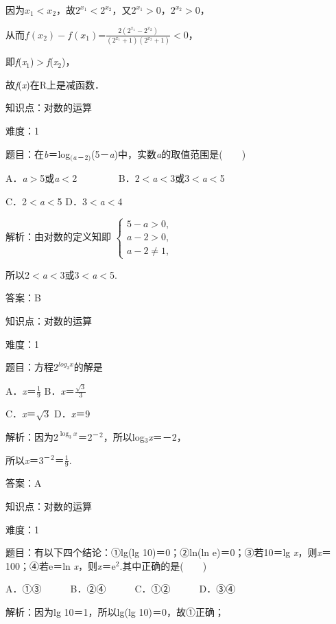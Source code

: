 \documentclass{article} %
\begin{document}
因为$x_{1}<x_{2}$，故$2^{x_{1}}<2^{x_{2}}$，又$2^{x_{1}}>0$，$2^{x_{2}}>0$，

从而$f(x_{2})-f(x_{1})$=$\frac{2(2^{x_{1}}-2^{x_{2}})}{(2^{x_{1}}+1)(2^{x_{2}}+1)}<0$，

即\textit{f}(\textit{x}${}_{1}$)$\mathrm{>}$\textit{f}(\textit{x}${}_{2}$)，

故\textit{f}(\textit{x})在R上是减函数．

知识点：对数的运算

难度：1

题目：在\textit{b}＝log${}_{(}$\textit{${}_{a}$}${}_{\textrm{－}}$${}_{2)}$(5－\textit{a})中，实数\textit{a}的取值范围是(　　)

A．\textit{a}$\mathrm{>}$5或\textit{a}$\mathrm{<}$2　　　　 B．2$\mathrm{<}$\textit{a}$\mathrm{<}$3或3$\mathrm{<}$\textit{a}$\mathrm{<}$5

C．2$\mathrm{<}$\textit{a}$\mathrm{<}$5   D．3$\mathrm{<}$\textit{a}$\mathrm{<}$4

解析：由对数的定义知即
$\left\{
\begin{array}{l}
5-a>0,\\
a-2>0,\\
a-2\neq 1,
\end{array}
\right.
$

所以2$\mathrm{<}$\textit{a}$\mathrm{<}$3或3$\mathrm{<}$\textit{a}$\mathrm{<}$5.

答案：B

知识点：对数的运算

难度：1

题目：方程$2^{log_3 x}$的解是

A．\textit{x}＝$\frac{1}{9}$   B．\textit{x}＝$\frac{\sqrt{3}}{3}$

C．\textit{x}＝$\sqrt{3}$   D．\textit{x}＝9

解析：因为$2^{\log_3 x}$＝2${}^{\textrm{－}}$${}^{2}$，所以log${}_{3}$\textit{x}＝－2，

所以\textit{x}＝3${}^{\textrm{－}}$${}^{2}$＝$\frac{1}{9}$.

答案：A

知识点：对数的运算

难度：1

题目：有以下四个结论：①lg(lg 10)＝0；②ln(ln e)＝0；③若10＝lg \textit{x}，则\textit{x}＝100；④若e＝ln \textit{x}，则\textit{x}＝e${}^{2}$.其中正确的是(　　)

A．①③　　　B．②④　　　C．①②　　　D．③④

解析：因为lg 10＝1，所以lg(lg 10)＝0，故①正确；
\end{document}
